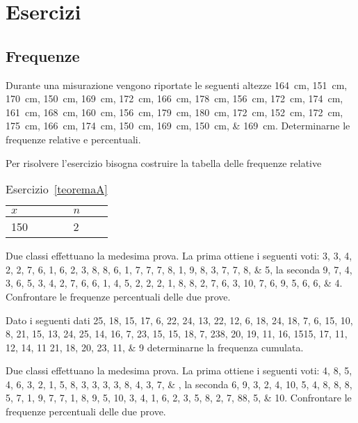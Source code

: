 \chapter{Esercizi}
%
\section{Frequenze}
\begin{esercizio}\label{teoremaA} 
Durante una misurazione vengono riportate le seguenti altezze \SIlist{164; 151; 170;  150; 169; 172; 166; 178; 156; 172; 174; 161; 168; 160; 156; 179;
	180; 172; 152; 172; 175; 166; 174; 150; 169; 150; 169}{\cm}. Determinarne  le frequenze relative e percentuali.
\end{esercizio}

\begin{soluzione}
	Per risolvere l'esercizio bisogna costruire la tabella delle frequenze relative
	\begin{table}
		\centering
		\begin{tabular}{ll}
			\toprule
			$x$ & $n$ \\
			\midrule
			150&2  \\
	\bottomrule
		\end{tabular}
	\captionsetup{labelformat=empty}
		\caption{Esercizio~\ref{teoremaA}}
	\end{table}
\end{soluzione}

\begin{esercizio}
 Due classi effettuano la medesima prova. La prima ottiene i seguenti voti: \numlist{3; 3; 4; 2; 2; 7; 6; 1; 6; 2; 3; 8; 8; 6; 1; 7; 7; 7; 8; 1; 9; 8; 3; 7; 7; 8; 5}, la seconda \numlist{9; 7; 4; 3; 6; 5; 3; 4; 2; 7; 6; 6; 1; 4; 5; 2; 2; 2; 1; 8; 8; 2; 7; 6; 3; 10; 7; 6; 9;
	5; 6; 6; 4}. Confrontare le frequenze percentuali delle due prove.
\end{esercizio}
\begin{esercizio}
Dato i seguenti dati \numlist{25; 18; 15; 17; 6; 22; 24; 13; 22; 12; 6; 18; 24; 18; 7; 6; 15; 10; 8; 21; 15; 13;
	24; 25; 14; 16; 7; 23; 15; 15; 18; 7; 23 8; 20; 19; 11; 16; 15 15; 17; 11; 12; 14; 11
	21; 18; 20; 23; 11; 9} determinarne la frequenza cumulata.
\end{esercizio}
\begin{esercizio}
	Due classi effettuano la medesima prova. La prima ottiene i seguenti voti: \numlist{4; 8; 5; 4; 6; 3; 2; 1; 5; 8; 3; 3; 3; 3; 8; 4; 3; 7;}, la seconda \numlist{6; 9; 3; 2; 4; 10; 5; 4; 8; 8; 8; 5; 7; 1; 9; 7; 7; 1; 8; 9; 5; 10; 3; 4; 1; 6; 2; 3; 5;
		8; 2; 7; 8 8; 5; 10}. Confrontare le frequenze percentuali delle due prove.
\end{esercizio} 
